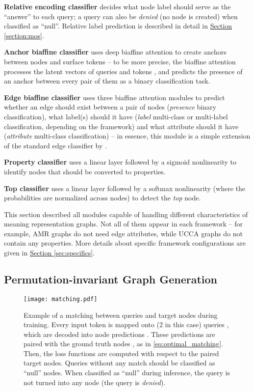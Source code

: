 \documentclass[11pt,a4paper]{article}
\newenvironment{citemize}{\begin{list}{}{\topsep=\smallskipamount\itemsep=1pt\parsep=1pt\labelwidth=.5em}}{\end{list}}
\newcommand{\secref}[1]{\hyperref[#1]{Section \ref*{#1}}}
\begin{document}
\begin{citemize}
  \item \textbf{Relative encoding classifier} decides what node label should serve as the ``answer'' to each query; a query can also be \emph{denied} (no node is created) when classified as ``null''. Relative label prediction is described in detail in \secref{section:mos}.
  
  \item \textbf{Anchor biaffine classifier} uses deep biaffine attention \cite{dozat2016deep} to create anchors between nodes and surface tokens -- to be more precise, the biaffine attention processes the latent vectors of queries  and tokens , and predicts the presence of an anchor between every pair of them as a binary classification task.
  
  \item \textbf{Edge biaffine classifier} uses three biaffine attention modules to predict whether an edge should exist between a pair of nodes (\emph{presence} binary classification), what label(s) should it have (\emph{label} multi-class or multi-label classification, depending on the framework) and what attribute should it have (\emph{attribute} multi-class classification) -- in essence, this module is a simple extension of the standard edge classifier by \citet{dozat2018simpler}.
  
  \item \textbf{Property classifier} uses a linear layer followed by a sigmoid nonlinearity to identify nodes that should be converted to properties.

  \item \textbf{Top classifier} uses a linear layer followed by a softmax nonlinearity (where the probabilities are normalized across nodes) to detect the \emph{top} node.
\end{citemize}

\noindent
This section described all modules capable of handling different characteristics of meaning representation graphs. Not all of them appear in each framework -- for example, AMR graphs do not need edge attributes, while UCCA graphs do not contain any properties. More details about specific framework configurations are given in \secref{sec:specifics}. %
 \subsection{Permutation-invariant Graph Generation}

\begin{figure*}[t]
\centering
\texttt{[image: matching.pdf]}
\caption{Example of a matching between queries and target nodes during training. Every input token is mapped onto  (2 in this case) queries , which are decoded into node predictions . These predictions are paired with the ground truth nodes , as in \autoref{eq:optimal_matching}. Then, the loss functions are computed with respect to the paired target nodes. Queries without any match should be classified as ``null'' nodes. When classified as ``null'' during inference, the query is not turned into any node (the query is \emph{denied}).}
\label{fig:matching}
\end{figure*}
\end{document}
